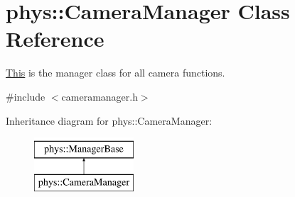 \hypertarget{classphys_1_1CameraManager}{
\section{phys::CameraManager Class Reference}
\label{d9/d91/classphys_1_1CameraManager}
}


\hyperlink{structThis}{This} is the manager class for all camera functions.  




{\ttfamily \#include $<$cameramanager.h$>$}

Inheritance diagram for phys::CameraManager:\begin{figure}[H]
\begin{center}
\leavevmode
\includegraphics[height=2cm]{d9/d91/classphys_1_1CameraManager}
\end{center}
\end{figure}
